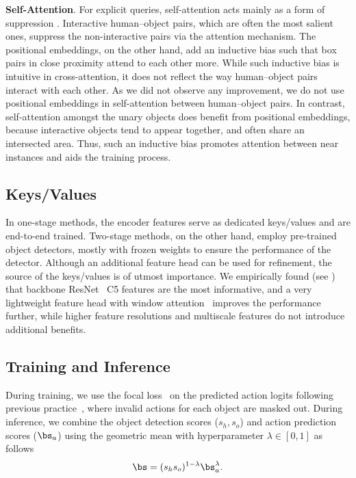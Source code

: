 \documentclass[10pt,twocolumn,letterpaper]{article}
\begin{document}
\textbf{Self-Attention}. For explicit queries, self-attention acts mainly as a form of suppression \cite{upt}. Interactive human--object pairs, which are often the most salient ones, suppress the non-interactive pairs via the attention mechanism. The positional embeddings, on the other hand, add an inductive bias such that box pairs in close proximity attend to each other more. While such inductive bias is intuitive in cross-attention, it does not reflect the way human--object pairs interact with each other. As we did not observe any improvement, we do not use positional embeddings in self-attention between human--object pairs. In contrast, self-attention amongst the unary objects does benefit from positional embeddings, because interactive objects tend to appear together, and often share an intersected area. Thus, such an inductive bias promotes attention between near instances and aids the training process.

\subsection{Keys/Values}

In one-stage methods, the encoder features serve as dedicated keys/values and are end-to-end trained. Two-stage methods, on the other hand, employ pre-trained object detectors, mostly with frozen weights to ensure the performance of the detector. Although an additional feature head can be used for refinement, the source of the keys/values is of utmost importance. We empirically found (see ) that backbone ResNet~\cite{resnet} C5 features are the most informative, and a very lightweight feature head with window attention~\cite{swint} improves the performance further, while higher feature resolutions and multiscale features do not introduce additional benefits.

\subsection{Training and Inference}

During training, we use the focal loss~\cite{retinanet} on the predicted action logits following previous practice~\cite{upt, stip}, where invalid actions for each object are masked out. During inference, we combine the object detection scores ($s_h, s_o$) and action prediction scores ($\bs_a$) using the geometric mean with hyperparameter $\lambda \in [0, 1]$
as follows
\begin{equation}
   \bs = (s_h s_o)^{1 - \lambda} \bs_a^{\lambda}.
   \label{eq:score}
\end{equation}
\end{document}
